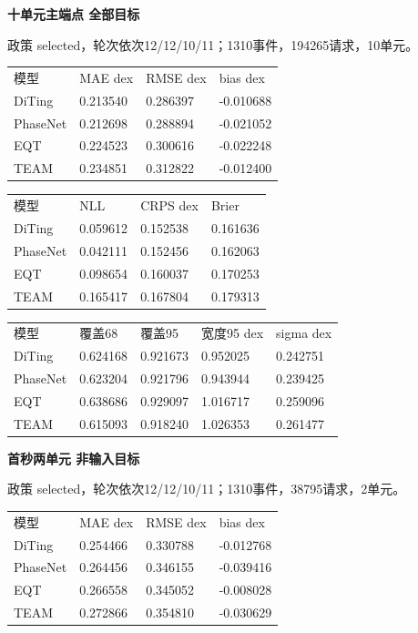 \documentclass[UTF8,a4paper,11pt]{ctexart}
\begin{document}
\par\textbf{十单元主端点 全部目标}\par

政策 selected，轮次依次12/12/10/11；1310事件，194265请求，10单元。

\begin{longtable}{llll}
模型 & MAE dex & RMSE dex & bias dex \\
DiTing & 0.213540 & 0.286397 & -0.010688 \\
PhaseNet & 0.212698 & 0.288894 & -0.021052 \\
EQT & 0.224523 & 0.300616 & -0.022248 \\
TEAM & 0.234851 & 0.312822 & -0.012400 \\
\end{longtable}

\begin{longtable}{llll}
模型 & NLL & CRPS dex & Brier \\
DiTing & 0.059612 & 0.152538 & 0.161636 \\
PhaseNet & 0.042111 & 0.152456 & 0.162063 \\
EQT & 0.098654 & 0.160037 & 0.170253 \\
TEAM & 0.165417 & 0.167804 & 0.179313 \\
\end{longtable}

\begin{longtable}{lllll}
模型 & 覆盖68 & 覆盖95 & 宽度95 dex & sigma dex \\
DiTing & 0.624168 & 0.921673 & 0.952025 & 0.242751 \\
PhaseNet & 0.623204 & 0.921796 & 0.943944 & 0.239425 \\
EQT & 0.638686 & 0.929097 & 1.016717 & 0.259096 \\
TEAM & 0.615093 & 0.918240 & 1.026353 & 0.261477 \\
\end{longtable}


\par\textbf{首秒两单元 非输入目标}\par

政策 selected，轮次依次12/12/10/11；1310事件，38795请求，2单元。

\begin{longtable}{llll}
模型 & MAE dex & RMSE dex & bias dex \\
DiTing & 0.254466 & 0.330788 & -0.012768 \\
PhaseNet & 0.264456 & 0.346155 & -0.039416 \\
EQT & 0.266558 & 0.345052 & -0.008028 \\
TEAM & 0.272866 & 0.354810 & -0.030629 \\
\end{longtable}
\end{document}
